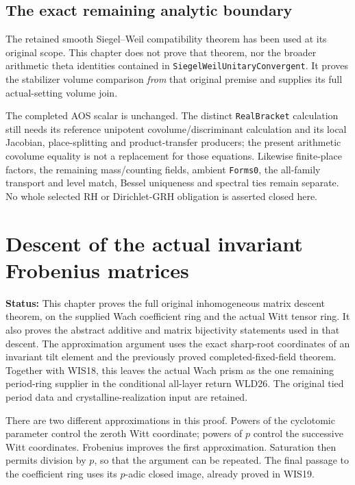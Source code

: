 \documentclass[11pt,a4paper]{article}
\numberwithin{equation}{section}
\theoremstyle{remark}\newtheorem{remark}[theorem]{Remark}
\newcommand{\status}[1]{\textbf{Status:} #1}
\begin{document}
\subsection{The exact remaining analytic boundary}

The retained smooth Siegel--Weil compatibility theorem has been
used at its original scope.  This chapter does not prove that
theorem, nor the broader arithmetic theta identities contained in
\texttt{Siegel\allowbreak Weil\allowbreak Unitary\allowbreak Convergent}.  It proves the stabilizer
volume comparison \emph{from} that original premise and supplies
its full actual-setting volume join.

The completed AOS scalar is unchanged.  The distinct
\texttt{Real\allowbreak Bracket} calculation still needs its reference
unipotent covolume/discriminant calculation and its local
Jacobian, place-splitting and product-transfer producers; the
present arithmetic covolume equality is not a replacement for
those equations.  Likewise finite-place factors, the remaining
mass/counting fields, ambient \texttt{Forms0}, the all-family
transport and level match, Bessel uniqueness and spectral ties
remain separate.  No whole selected RH or Dirichlet-GRH
obligation is asserted closed here.


\section{Descent of the actual invariant Frobenius matrices}
\label{sec:invariant-frobenius-descent-v055}

\status{This chapter proves the full original inhomogeneous matrix
descent theorem, on the supplied Wach coefficient ring and the actual
Witt tensor ring. It also proves the abstract additive and matrix
bijectivity statements used in that descent. The approximation argument
uses the exact sharp-root coordinates of an invariant tilt element and
the previously proved completed-fixed-field theorem. Together with WIS18,
this leaves the actual Wach prism as the one remaining period-ring
supplier in the conditional all-layer return WLD26. The original tied
period data and crystalline-realization input are retained.}

There are two different approximations in this proof. Powers of the
cyclotomic parameter control the zeroth Witt coordinate; powers of $p$
control the successive Witt coordinates. Frobenius improves the first
approximation. Saturation then permits division by $p$, so that the
argument can be repeated. The final passage to the coefficient ring uses
its $p$-adic closed image, already proved in WIS19.
\end{document}

